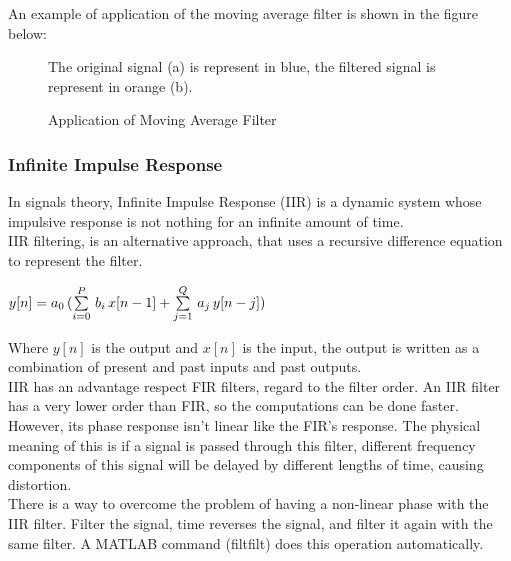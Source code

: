 \documentclass{standalone}
\begin{document}
\noindent An example of application of the moving average filter is shown in the figure below:
 
\begin{figure}[H]	

\centering
{}

The original signal (a) is represent in blue, the filtered signal is represent in orange (b).
 \caption{Application of Moving Average Filter}
  \label{fig:Application of Moving Average	 Filter.}
\end{figure}
\subsubsection{Infinite Impulse Response} \label{Infite Impulse Response}
In signals theory, Infinite Impulse Response (IIR) is a dynamic system whose impulsive response is not nothing for an infinite amount of time.\\
IIR filtering, is an alternative approach, that uses a recursive difference equation to represent the filter.

\begin{center}
\begin{large}
$ y[n] = a_{0} \thinspace (\sum\limits_{i=0}^{P}\thinspace  b_{i} \thinspace x[n-1] + \sum\limits_{j=1}^{Q} \thinspace  a_{j} \thinspace  y[n-j])$

\end{large}\end{center}



Where $y[n]$ is the output and $x[n]$ is the input, the output is written as a combination of present and past inputs and past outputs.\\

IIR has an advantage respect FIR filters, regard to the filter order. An IIR filter has a very lower order than FIR, so the computations can be done faster. However, its phase response isn’t linear like the FIR’s response. The physical meaning of this is if a signal is passed through this filter, different frequency components of this signal will be delayed by different lengths of time, causing distortion. \\
There is a way to overcome the problem of having a non-linear phase with the IIR filter. 
Filter the signal, time reverses the signal, and filter it again with the same filter. A MATLAB command (filtfilt)  does this operation automatically. 
\end{document}
